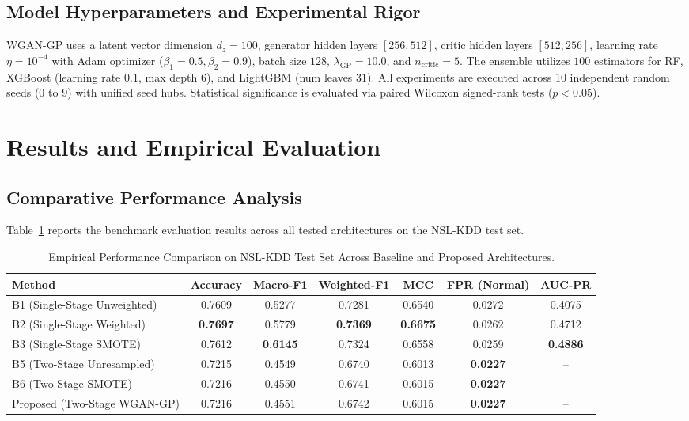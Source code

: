 \documentclass[journal]{IEEEtran}
\begin{document}
\subsection{Model Hyperparameters and Experimental Rigor}
WGAN-GP uses a latent vector dimension $d_z = 100$, generator hidden layers $[256, 512]$, critic hidden layers $[512, 256]$, learning rate $\eta = 10^{-4}$ with Adam optimizer ($\beta_1 = 0.5, \beta_2 = 0.9$), batch size $128$, $\lambda_{\text{GP}} = 10.0$, and $n_{\text{critic}} = 5$. The ensemble utilizes $100$ estimators for RF, XGBoost (learning rate $0.1$, max depth $6$), and LightGBM (num leaves $31$). All experiments are executed across 10 independent random seeds ($0$ to $9$) with unified seed hubs. Statistical significance is evaluated via paired Wilcoxon signed-rank tests ($p < 0.05$).

\section{Results and Empirical Evaluation}
\label{sec:results}

\subsection{Comparative Performance Analysis}
Table~\ref{tab:performance_summary} reports the benchmark evaluation results across all tested architectures on the NSL-KDD test set.

\begin{table}[t]
\centering
\caption{Empirical Performance Comparison on NSL-KDD Test Set Across Baseline and Proposed Architectures.}
\label{tab:performance_summary}
\begin{tabular}{lcccccc}
\toprule
\textbf{Method} & \textbf{Accuracy} & \textbf{Macro-F1} & \textbf{Weighted-F1} & \textbf{MCC} & \textbf{FPR (Normal)} & \textbf{AUC-PR} \\
\midrule
B1 (Single-Stage Unweighted) & 0.7609 & 0.5277 & 0.7281 & 0.6540 & 0.0272 & 0.4075 \\
B2 (Single-Stage Weighted)   & \textbf{0.7697} & 0.5779 & \textbf{0.7369} & \textbf{0.6675} & 0.0262 & 0.4712 \\
B3 (Single-Stage SMOTE)      & 0.7612 & \textbf{0.6145} & 0.7324 & 0.6558 & 0.0259 & \textbf{0.4886} \\
B5 (Two-Stage Unresampled)   & 0.7215 & 0.4549 & 0.6740 & 0.6013 & \textbf{0.0227} & -- \\
B6 (Two-Stage SMOTE)         & 0.7216 & 0.4550 & 0.6741 & 0.6015 & \textbf{0.0227} & -- \\
Proposed (Two-Stage WGAN-GP) & 0.7216 & 0.4551 & 0.6742 & 0.6015 & \textbf{0.0227} & -- \\
\bottomrule
\end{tabular}
\end{table}
\end{document}
